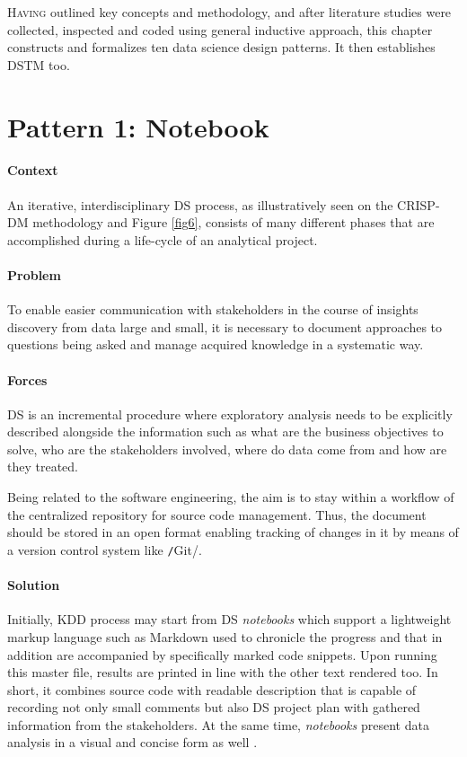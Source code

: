 \lettrine[lines=2]{\color{BrickRed}H}{aving} outlined key concepts and methodology, and after literature studies were collected, inspected and coded using general inductive approach, this chapter constructs and formalizes ten data science design patterns. 
It then establishes \acl{DSTM} too.

\section{Pattern 1: Notebook}

\paragraph*{Context}
An iterative, interdisciplinary \ac{DS} process, as illustratively seen on the \ac{CRISP-DM} methodology and Figure \ref{fig6}, consists of many different phases that are accomplished during a life-cycle of an analytical project.

\paragraph*{Problem}
To enable easier communication with stakeholders in the course of insights discovery from data large and small, it is necessary to document approaches to questions being asked and manage acquired knowledge in a systematic way.

\paragraph*{Forces}
\begin{compactitem}
   \item \ac{DS} is an incremental procedure where exploratory analysis needs to be explicitly described alongside the information such as what are the business objectives to solve, who are the stakeholders involved, where do data come from and how are they treated.
   \item Being related to the software engineering, the aim is to stay within a workflow of the centralized repository for source code management.
   Thus, the document should be stored in an open format enabling tracking of changes in it by means of a version control system like \texttt/Git/.
\end{compactitem}

\paragraph*{Solution}
Initially, \ac{KDD} process may start from \ac{DS} \emph{notebooks} which support a lightweight markup language such as Markdown used to chronicle the progress and that in addition are accompanied by specifically marked code snippets. 
Upon running this master file, results are printed in line with the other text rendered too.
In short, it combines source code with readable description that is capable of recording not only small comments but also \ac{DS} project plan with gathered information from the stakeholders. 
At the same time, \emph{notebooks} present data analysis in a visual and concise form as well \parencites{WilsonGred2017}{NatureBPDASNMRI2017}. 

